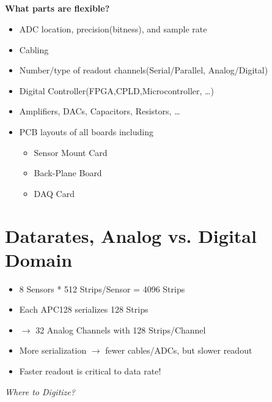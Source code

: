 \documentclass{beamer}
\begin{document}
\subsection{}
\begin{frame}
  \textbf{What parts are flexible?}
  \begin{itemize}
    \item ADC location, precision(bitness), and sample rate
    \item Cabling
    \item Number/type of readout channels(Serial/Parallel, Analog/Digital)
    \item Digital Controller(FPGA,CPLD,Microcontroller, \dots)
    \item Amplifiers, DACs, Capacitors, Resistors, \dots
    \item PCB layouts of all boards including
      \begin{itemize}
        \item Sensor Mount Card
        \item Back-Plane Board
        \item DAQ Card
      \end{itemize}
  \end{itemize}
\end{frame}


\section{Datarates, Analog vs. Digital Domain}
\begin{frame}
  \begin{itemize}
    \item 8 Sensors * 512 Strips/Sensor = 4096 Strips
    \item Each APC128 serializes 128 Strips
    \item $\rightarrow$ 32 Analog Channels with 128 Strips/Channel
    \item More serialization $\rightarrow$ fewer cables/ADCs, but slower readout
    \item Faster readout is critical to data rate!
  \end{itemize}

  \vspace{0.5 in}
  \begin{center}
    \huge \emph{Where to Digitize?}
  \end{center}
\end{frame}
\end{document}

